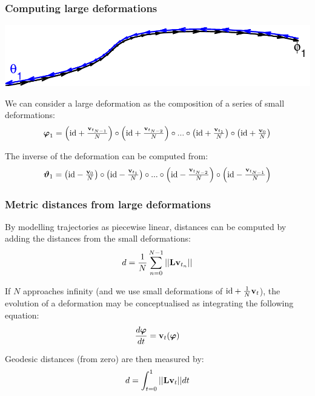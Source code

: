 \begin{frame}
\frametitle{Computing large deformations}
\includegraphics[width=\textwidth]{trajectory0}\par
We can consider a large deformation as the composition of a series of small deformations:
\begin{eqnarray*}
{\boldsymbol\varphi}_{1} = \left(\mathrm{id} + \tfrac{{\bf v}_{t_{N-1}}}{N}\right) \circ  \left(\mathrm{id} + \tfrac{{\bf v}_{t_{N-2}}}{N}\right) \circ ... \circ \left(\mathrm{id} + \tfrac{{\bf v}_{t_1}}{N}\right) \circ \left(\mathrm{id} + \tfrac{{\bf v}_0}{N}\right)
\end{eqnarray*}

The inverse of the deformation can be computed from:
\begin{eqnarray*}
{\boldsymbol\vartheta}_{1} = \left(\mathrm{id} - \tfrac{{\bf v}_0}{N}\right) \circ  \left(\mathrm{id} - \tfrac{{\bf v}_{t_1}}{N}\right) \circ ... \circ \left(\mathrm{id} - \tfrac{{\bf v}_{t_{N-2}}}{N}\right) \circ \left(\mathrm{id} - \tfrac{{\bf v}_{t_{N-1}}}{N}\right)
\end{eqnarray*}

\end{frame}


\begin{frame}
\frametitle{Metric distances from large deformations}
By modelling trajectories as piecewise linear, distances can be computed by adding the distances from the small deformations:
\begin{eqnarray*}
d = \frac{1}{N}\sum_{n=0}^{N-1} || {\bf L} {\bf v}_{t_n} ||
\end{eqnarray*}

If $N$ approaches infinity (and we use small deformations of $\mathrm{id} + \frac{1}{N}{\bf v}_t$), the evolution of a deformation may be conceptualised as integrating the following equation:
\begin{eqnarray*}
\frac{d {\boldsymbol\varphi}}{d t} = {\bf v}_t ({\boldsymbol\varphi})
\end{eqnarray*}

Geodesic distances (from zero) are then measured by:
\begin{eqnarray*}
d = \int_{t=0}^1  || {\bf L} {\bf v}_t || dt
\end{eqnarray*}
\end{frame}

